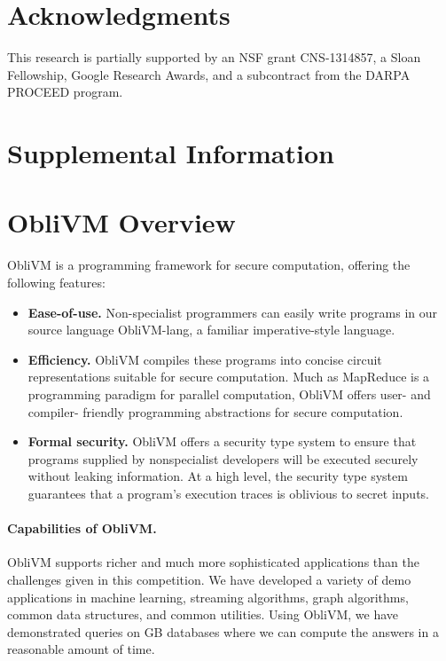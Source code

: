 \documentclass[11pt]{article}
\begin{document}


\section*{Acknowledgments}
This research is partially supported 
by an NSF grant CNS-1314857, a Sloan Fellowship, 
Google Research Awards, 
and a subcontract from the DARPA PROCEED program.

\appendix

\section*{Supplemental Information}
\section{{\sf ObliVM} Overview}

{\sf ObliVM} is a programming framework for secure computation, offering the 
following features:
\begin{itemize}
\item
{\bf Ease-of-use.} Non-specialist programmers can easily 
write programs in our source language {\sf ObliVM-lang}, a 
familiar imperative-style language.
\item
{\bf Efficiency.} {\sf ObliVM} compiles these programs into 
concise circuit representations suitable for secure computation. 
Much as MapReduce is a programming paradigm for 
parallel computation, {\sf ObliVM} offers user- and compiler- friendly
programming abstractions for secure computation.
\item
{\bf Formal security.}
{\sf ObliVM} offers a security type system to ensure 
that programs supplied by nonspecialist developers
will be executed securely without leaking information.
At a high level, the security type system guarantees
that a program's execution traces 
is oblivious to secret inputs.
\end{itemize}

\paragraph{Capabilities of {\sf ObliVM}.} 
{\sf ObliVM} supports richer and much more sophisticated applications
than the challenges given in this competition.
We have developed a variety of demo applications in machine learning,
streaming algorithms, graph algorithms, 
common data structures, and common utilities.
Using {\sf ObliVM}, we have demonstrated queries on {\sf GB} 
databases where we can compute the answers in a reasonable amount of time. 
\end{document}
